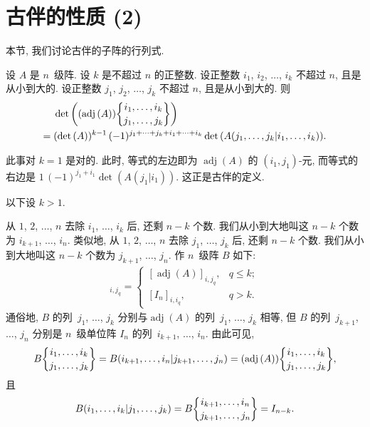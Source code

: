 \documentclass[../libro.tex]{subfiles}
\begin{document}
\section{古伴的性质 (2)}

本节, 我们讨论古伴的子阵的行列式.


\begin{theorem}
    设 \(A\) 是 \(n\)~级阵.
    设 \(k\) 是不超过 \(n\) 的正整数.
    设正整数 \(i_1\), \(i_2\), \(\dots\), \(i_k\)
    不超过 \(n\), 且是从小到大的.
    设正整数 \(j_1\), \(j_2\), \(\dots\), \(j_k\)
    不超过 \(n\), 且是从小到大的.
    则
    \begin{equation}
        \begin{aligned}
            & \det {\left(
                    (\operatorname{adj} {(A)})
                    \submat{i_1,\dots,i_k}{j_1,\dots,j_k}
            \right)}
            \\
            = {} &
            (\det {(A)})^{k-1}\,
            (-1)^{j_1 + \dots + j_k + i_1 + \dots + i_k}
            \det {(A({j_1,\dots,j_k}|{i_1,\dots,i_k}))}.
        \end{aligned}
        \label{eq:C2401}
    \end{equation}
\end{theorem}

此事对 \(k = 1\) 是对的.
此时, 等式的左边即为 \(\operatorname{adj} {(A)}\)
的 \((i_1, j_1)\)-元,
而等式的右边是
\(1 \, (-1)^{j_1 + i_1} \det {(A(j_1|i_1))}\).
这正是古伴的定义.

以下设 \(k > 1\).

从 \(1\), \(2\), \(\dots\), \(n\)
去除 \(i_1\), \(\dots\), \(i_k\) 后,
还剩 \(n - k\) 个数.
我们从小到大地叫这 \(n - k\) 个数为
\(i_{k+1}\), \(\dots\), \(i_n\).
类似地, 从 \(1\), \(2\), \(\dots\), \(n\)
去除 \(j_1\), \(\dots\), \(j_k\) 后,
还剩 \(n - k\) 个数.
我们从小到大地叫这 \(n - k\) 个数为
\(j_{k+1}\), \(\dots\), \(j_n\).
作 \(n\)~级阵 \(B\) 如下:
\begin{align*}
    [B]_{i,j_q} =
    \begin{cases}
        [\operatorname{adj} {(A)}]_{i,j_q},
        & q \leq k; \\
        [I_n]_{i,i_q},
        & q > k.
    \end{cases}
\end{align*}
通俗地, \(B\) 的列~\(j_1\), \(\dots\), \(j_k\)
分别与\(\operatorname{adj} {(A)}\)
的列~\(j_1\), \(\dots\), \(j_k\)
相等,
但 \(B\) 的列~\(j_{k+1}\), \(\dots\), \(j_n\)
分别是 \(n\)~级单位阵 \(I_n\)
的列~\(i_{k+1}\), \(\dots\), \(i_n\).
由此可见,
\begin{align*}
    B\submat{i_1,\dots,i_k}{j_1,\dots,j_k}
    = B({i_{k+1},\dots,i_n}|{j_{k+1},\dots,j_n})
    = (\operatorname{adj} {(A)})
    \submat{i_1,\dots,i_k}{j_1,\dots,j_k},
\end{align*}
且
\begin{align*}
    B({i_1,\dots,i_k}|{j_1,\dots,j_k})
    = B\submat{i_{k+1},\dots,i_n}{j_{k+1},\dots,j_n}
    = I_{n-k}.
\end{align*}
\end{document}
